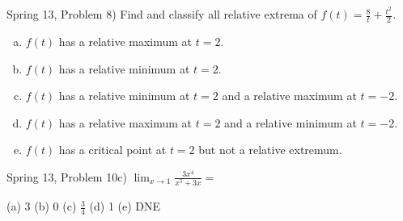 \documentclass[12pt]{article}
\newcommand{\ds}{\displaystyle}
\newenvironment{problem}[2][Problem]{\begin{trivlist}
\item[\hskip \labelsep {\bfseries #1}\hskip \labelsep {\bfseries #2.}]}{\end{trivlist}}
\begin{document}
\begin{problem}{37}
(Spring 13, Problem 8) Find and classify all relative extrema of $f(t) = \ds\frac{8}{t} + \frac{t^{2}}{2}$. 
\begin{enumerate}[(a)]
  \item $f(t)$ has a relative maximum at $t = 2$. 
  \item $f(t)$ has a relative minimum at $t = 2$. 
  \item $f(t)$ has a relative minimum at $t = 2$ and a relative maximum at $t = -2$. 
  \item $f(t)$ has a relative maximum at $t = 2$ and a relative minimum at $t = -2$. 
  \item $f(t)$ has a critical point at $t = 2$ but not a relative extremum. 
\end{enumerate}
\end{problem}

\vspace{1in}

\begin{problem}{38}
(Spring 13, Problem 10c) $\ds\lim_{x\rightarrow 1} \frac{3x^{4}}{x^{5} + 3x} = $
\begin{center}
  (a) 3 \qquad
  (b) 0 \qquad
  (c) $\ds\frac{3}{4}$ \qquad
  (d) 1 \qquad
  (e) DNE
\end{center}
\end{problem}
















\end{document}
